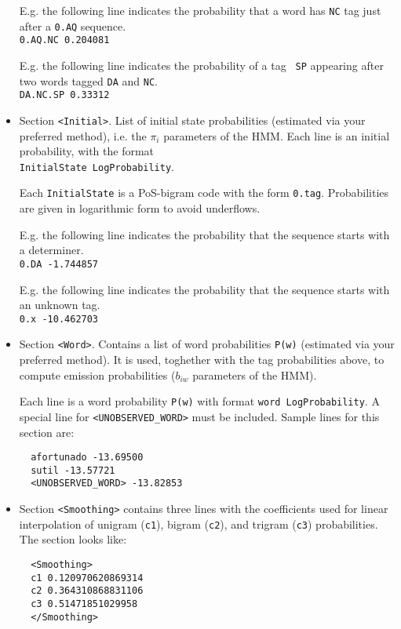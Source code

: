 \documentclass[a4paper]{book}
\begin{document}
\begin{itemize}
    E.g. the following line indicates the probability that a word 
    has {\tt NC} tag just after a {\tt 0.AQ} sequence.\\
    {\tt 0.AQ.NC 0.204081}

    E.g. the following line indicates the probability of a tag {\tt
    SP} appearing after two words tagged {\tt DA} and {\tt NC}.\\
    {\tt DA.NC.SP 0.33312}

    \item Section \verb#<Initial>#. List of initial state probabilities
  (estimated via your preferred method), i.e. the $\pi_{i}$ parameters of
  the HMM.    Each line is an initial probability, with the format\\
 {\tt InitialState LogProbability}.

   Each {\tt InitialState} is a PoS-bigram code with the
   form {\tt 0.tag}. Probabilities are given in logarithmic form to avoid
   underflows.

    E.g. the following line indicates the probability that the
    sequence starts with a determiner.\\
    {\tt 0.DA -1.744857}

    E.g. the following line indicates the probability that the
    sequence starts with an unknown tag.\\
    {\tt 0.x -10.462703}

    \item Section \verb#<Word>#. Contains a list of word probabilities
  {\tt P(w)} (estimated via your preferred method). It is used, toghether with
  the tag probabilities above, to compute emission probabilities
  ($b_{iw}$ parameters of the HMM).

   Each line is a word probability {\tt P(w)} with format {\tt word
     LogProbability}. A special line for \verb#<UNOBSERVED_WORD># must
   be included. Sample lines for this section are:

    \verb#  afortunado -13.69500# \\
    \verb#  sutil -13.57721# \\
    \verb#  <UNOBSERVED_WORD> -13.82853# 

    \item Section \verb#<Smoothing># contains three lines with the coefficients
    used for linear interpolation of unigram (\verb#c1#), bigram (\verb#c2#),
    and trigram (\verb#c3#) probabilities.
    The section looks like:

    \verb#  <Smoothing># \\
    \verb#  c1 0.120970620869314# \\
    \verb#  c2 0.364310868831106# \\
    \verb#  c3 0.51471851029958# \\
    \verb#  </Smoothing># 


\end{itemize}
\end{document}
